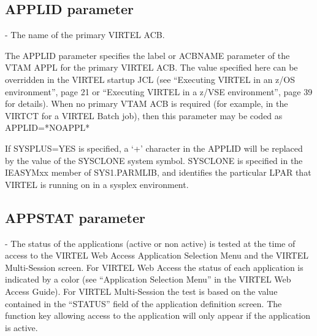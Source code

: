 \documentclass[letterpaper,10pt,english]{sphinxmanual}
\begin{document}

\subsection{APPLID parameter}
\label{\detokenize{Installation_Guide:id6}}\label{\detokenize{Installation_Guide:index-34}}
\begin{sphinxVerbatim}[commandchars=\\\{\}]
 
\end{sphinxVerbatim}

 - The name of the primary VIRTEL ACB.

The APPLID parameter specifies the label or ACBNAME parameter of the VTAM APPL for the primary VIRTEL ACB. The value specified here can be overridden in the VIRTEL startup JCL (see “Executing VIRTEL in an z/OS environment”, page 21 or “Executing VIRTEL in a z/VSE environment”, page 39 for details). When no primary VTAM ACB is required (for example, in the VIRTCT for a VIRTEL Batch job), then this parameter may be coded as APPLID=*NOAPPL*

If SYSPLUS=YES is specified, a ‘+’ character in the APPLID will be replaced by the value of the SYSCLONE system symbol. SYSCLONE is specified in the IEASYMxx member of SYS1.PARMLIB, and identifies the particular LPAR that VIRTEL is running on in a sysplex environment.


\subsection{APPSTAT parameter}
\label{\detokenize{Installation_Guide:appstat-parameter}}\label{\detokenize{Installation_Guide:index-35}}
\begin{sphinxVerbatim}[commandchars=\\\{\}]
 
\end{sphinxVerbatim}

 - The status of the applications (active or non active) is tested at the time of access to the VIRTEL Web Access Application Selection Menu and the VIRTEL Multi-Session screen. For VIRTEL Web Access the status of each application is indicated by a color (see “Application Selection Menu” in the VIRTEL Web Access Guide). For VIRTEL Multi-Session the test is based on the value contained in the “STATUS” field of the application definition screen. The function key allowing access to the application will only appear if the application is active.
\end{document}
